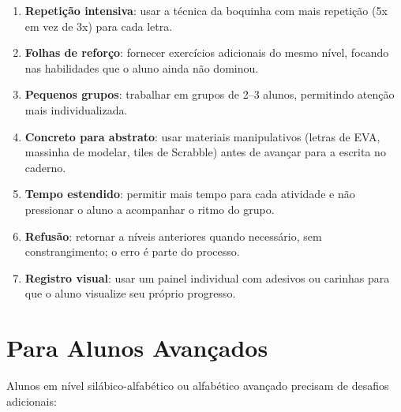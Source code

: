 \begin{enumerate}[leftmargin=2cm]
  \item \textbf{Repeti\c{c}\~{a}o intensiva}: usar a t\'{e}cnica da
  boquinha com mais repeti\c{c}\~{a}o (5x em vez de 3x) para cada letra.

  \item \textbf{Folhas de refor\c{c}o}: fornecer exerc\'{i}cios
  adicionais do mesmo n\'{i}vel, focando nas habilidades que o aluno
  ainda n\~{a}o dominou.

  \item \textbf{Pequenos grupos}: trabalhar em grupos de 2--3 alunos,
  permitindo aten\c{c}\~{a}o mais individualizada.

  \item \textbf{Concreto para abstrato}: usar materiais manipulativos
  (letras de EVA, massinha de modelar, tiles de Scrabble) antes de
  avan\c{c}ar para a escrita no caderno.

  \item \textbf{Tempo estendido}: permitir mais tempo para cada atividade
  e n\~{a}o pressionar o aluno a acompanhar o ritmo do grupo.

  \item \textbf{Refus\~{a}o}: retornar a n\'{i}veis anteriores quando
  necess\'{a}rio, sem constrangimento; o erro \'{e} parte do processo.

  \item \textbf{Registro visual}: usar um painel individual com adesivos
  ou carinhas para que o aluno visualize seu pr\'{o}prio progresso.
\end{enumerate}

\section{Para Alunos Avan\c{c}ados}

Alunos em n\'{i}vel sil\'{a}bico-alfab\'{e}tico ou alfab\'{e}tico
avan\c{c}ado precisam de desafios adicionais:

